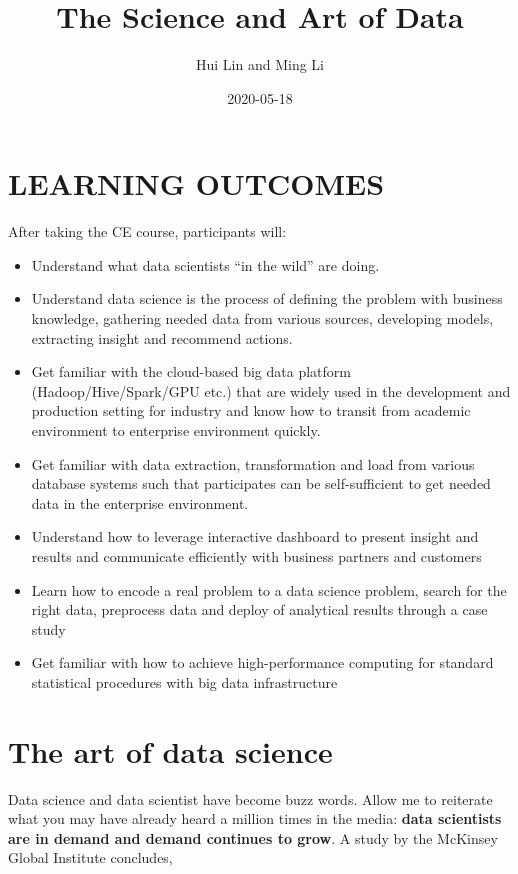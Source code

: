 \documentclass[
]{article}
\title{The Science and Art of Data}
\author{Hui Lin and Ming Li}
\date{2020-05-18}
\begin{document}
\maketitle

\hypertarget{learning-outcomes}{%
\section{LEARNING OUTCOMES}\label{learning-outcomes}}

After taking the CE course, participants will:

\begin{itemize}
\item
  Understand what data scientists ``in the wild'' are doing.
\item
  Understand data science is the process of defining the problem with
  business knowledge, gathering needed data from various sources,
  developing models, extracting insight and recommend actions.
\item
  Get familiar with the cloud-based big data platform
  (Hadoop/Hive/Spark/GPU etc.) that are widely used in the development
  and production setting for industry and know how to transit from
  academic environment to enterprise environment quickly.
\item
  Get familiar with data extraction, transformation and load from
  various database systems such that participates can be self-sufficient
  to get needed data in the enterprise environment.
\item
  Understand how to leverage interactive dashboard to present insight
  and results and communicate efficiently with business partners and
  customers
\item
  Learn how to encode a real problem to a data science problem, search
  for the right data, preprocess data and deploy of analytical results
  through a case study
\item
  Get familiar with how to achieve high-performance computing for
  standard statistical procedures with big data infrastructure 
\end{itemize}

\hypertarget{the-art-of-data-science}{%
\section{The art of data science}\label{the-art-of-data-science}}

Data science and data scientist have become buzz words. Allow me to
reiterate what you may have already heard a million times in the media:
\textbf{data scientists are in demand and demand continues to grow}. A
study by the McKinsey Global Institute concludes,
\end{document}
